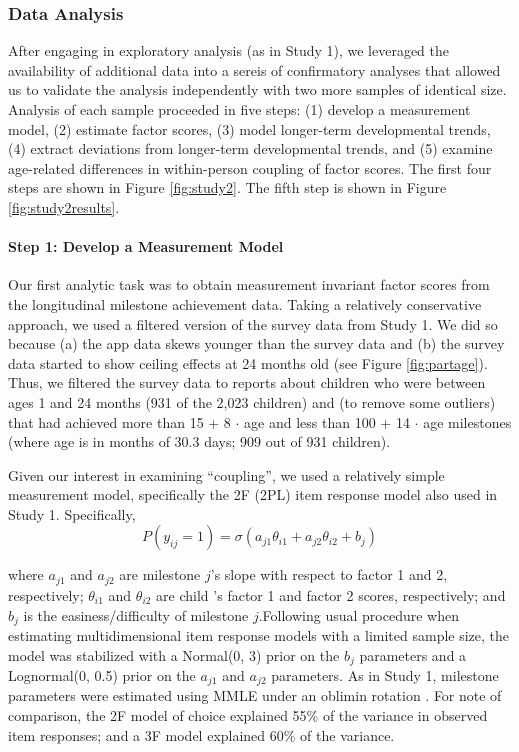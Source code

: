\documentclass[man, floatsintext]{apa7}
\begin{document}
\subsubsection{Data Analysis}

After engaging in exploratory analysis (as in Study 1), we leveraged the availability of additional data into a sereis of confirmatory analyses that allowed us to validate the analysis independently with two more samples of identical size. Analysis of each sample proceeded in five steps: (1) develop a measurement model, (2) estimate
factor scores, (3) model longer-term developmental trends, (4) extract
deviations from longer-term developmental trends, and (5) examine
age-related differences in within-person coupling of factor scores. The
first four steps are shown in Figure \ref{fig:study2}. The fifth step is
shown in Figure \ref{fig:study2results}.

\paragraph{Step 1: Develop a Measurement
Model}
Our first analytic task was to obtain measurement invariant factor
scores from the longitudinal milestone achievement data. Taking a
relatively conservative approach, we used a filtered version of the
survey data from Study 1. We did so because (a) the app data skews younger than the
survey data and (b) the survey data started to show ceiling effects at
24 months old (see Figure \ref{fig:partage}). Thus, we filtered
the survey data to reports about children who were between ages 1 and 24 months (931 of the
2,023 children) and (to remove some outliers) that had achieved more than 15 + 8 $\cdot$ age and less
than 100 + 14 $\cdot$ age milestones (where age is in months of 30.3 days; 909
out of 931 children).

Given our interest in examining ``coupling'', we used a relatively simple measurement model, specifically the 2F (2PL) item response model also used in Study 1. Specifically,
\begin{equation}
P(y_{ij} = 1) = \sigma(a_{j1}\theta_{i1} + a_{j2}\theta_{i2} + b_j)
\end{equation}

\noindent where $a_{j1}$ and $a_{j2}$ are milestone $j$'s
slope with respect to factor 1 and 2, respectively; $\theta_{i1}$ and
$\theta_{i2}$ are child 's factor 1 and factor 2 scores, respectively;
and $b_j$ is the easiness/difficulty of milestone $j$.Following usual procedure when estimating
multidimensional item response models with a limited sample size, the model was stabilized with a Normal(0, 3)
prior on the $b_j$ parameters and a Lognormal(0, 0.5) prior on the $a_{j1}$ and
$a_{j2}$ parameters. As in Study 1, milestone
parameters were estimated using MMLE under an oblimin rotation \parencite{jennrich1966}. For note of comparison, the 2F model of choice explained 55\% of the variance in observed item responses; and a 3F model explained 60\% of the variance.
\end{document}
